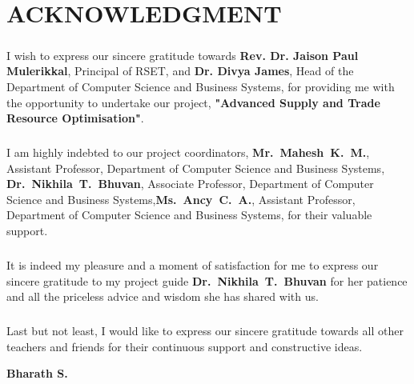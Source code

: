 \chapter*{ACKNOWLEDGMENT}
\setcounter{page}{1}
\vspace{1.5cm}


\paragraph{} I wish to express our sincere gratitude towards \textbf{Rev. Dr. Jaison Paul Mulerikkal}, Principal of RSET, and \textbf{Dr. Divya James}, Head of the Department of Computer Science and Business Systems, for providing me with the opportunity to undertake our project, \textbf{"Advanced Supply and Trade Resource Optimisation"}.

\paragraph{} I am highly indebted to our project coordinators,  \textbf{\mbox{Mr. Mahesh K. M.}}, Assistant Professor, Department of Computer Science and Business Systems, \textbf{\mbox{Dr. Nikhila T. Bhuvan}}, \mbox{Associate} Professor, Department of Computer Science and Business Systems,\textbf{\mbox{Ms. Ancy C. A.}}, Assistant Professor, Department of Computer Science and Business Systems, for their valuable support.

\paragraph{} It is indeed my pleasure and a moment of satisfaction for me to express our sincere gratitude to my project guide \textbf{\mbox{Dr. Nikhila T. Bhuvan}} for her patience and all the priceless advice and wisdom she has shared with us.

\paragraph{} Last but not least, I would like to express our sincere gratitude towards all other teachers and friends for their continuous support and constructive ideas.

\begin{flushright}
	\textbf{Bharath S.}\\
\end{flushright}
